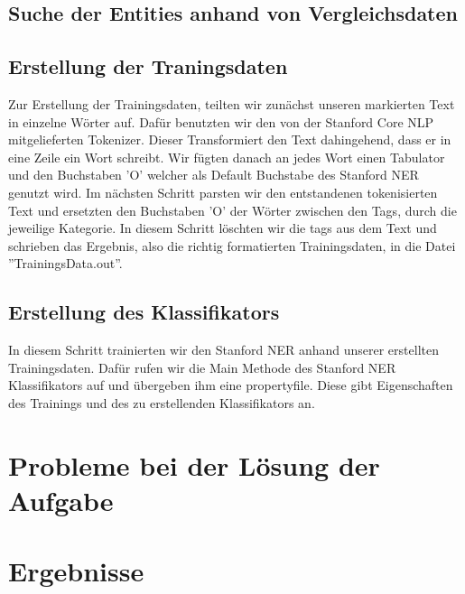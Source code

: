 \documentclass[a4paper]{article}
\begin{document}
\subsection{Suche der Entities anhand von Vergleichsdaten}
\subsection{Erstellung der Traningsdaten}
Zur Erstellung der Trainingsdaten, teilten wir zunächst unseren markierten Text in einzelne Wörter auf. Dafür benutzten wir den von der Stanford Core NLP mitgelieferten Tokenizer. Dieser Transformiert den Text dahingehend, dass er in eine Zeile ein Wort schreibt. Wir fügten danach an jedes Wort einen Tabulator und den Buchstaben 'O' welcher als Default Buchstabe des Stanford NER genutzt wird.
Im nächsten Schritt parsten wir den entstandenen tokenisierten Text und ersetzten den Buchstaben 'O' der Wörter zwischen den Tags, durch die jeweilige Kategorie. In diesem Schritt löschten wir die tags aus dem Text und schrieben das Ergebnis, also die richtig formatierten Trainingsdaten, in die Datei ''TrainingsData.out''.

\subsection{Erstellung des Klassifikators}
In diesem Schritt trainierten wir den Stanford NER anhand unserer erstellten Trainingsdaten. Dafür rufen wir die Main Methode des Stanford NER Klassifikators auf und übergeben ihm eine propertyfile. Diese gibt Eigenschaften des Trainings und des zu erstellenden Klassifikators an.

\section{Probleme bei der Lösung der Aufgabe}
\section{Ergebnisse}
\end{document}
